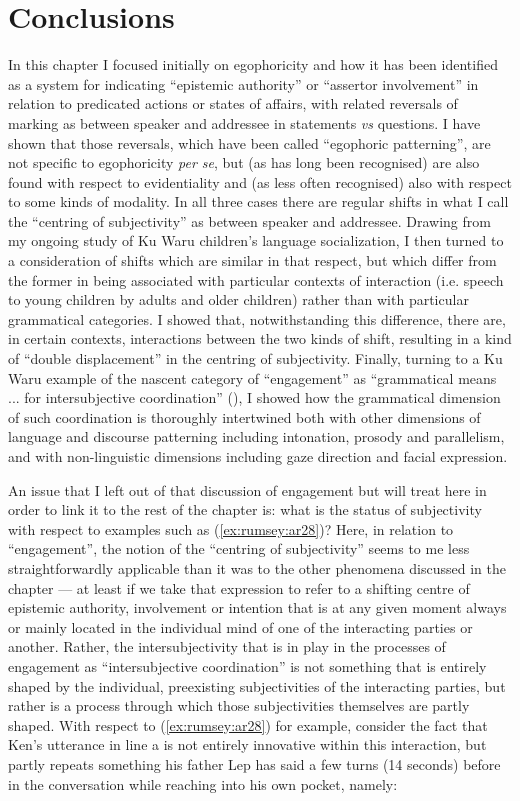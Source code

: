 \documentclass[output=paper]{langsci/langscibook}
\begin{document}
\section{Conclusions}\label{s:ar8}

In this chapter I focused initially on egophoricity and how it has been identified as a system for indicating “epistemic authority” or “assertor involvement” in relation to predicated actions or states of affairs, with related reversals of marking as between speaker and addressee in statements \textit{vs} questions. I have shown that those reversals, which have been called “egophoric patterning”, are not specific to egophoricity \textit{per se}, but (as has long been recognised) are also found with respect to evidentiality and (as less often recognised) also with respect to some kinds of modality. In all three cases there are regular shifts in what I call the “centring of subjectivity” as between speaker and addressee. Drawing from my ongoing study of Ku Waru children’s language socialization, I then turned to a consideration of shifts which are similar in that respect, but which differ from the former in being associated with particular contexts of interaction (i.e. speech to young children by adults and older children) rather than with particular grammatical categories. I showed that, notwithstanding this difference, there are, in certain contexts, interactions between the two kinds of shift, resulting in a kind of “double displacement” in the centring of subjectivity.  Finally, turning to a Ku Waru example of the nascent category of “engagement” as “grammatical means ... for intersubjective coordination” (\citealt[112]{Evansetal2018a}), I showed how the grammatical dimension of such coordination is thoroughly intertwined both with other dimensions of language and discourse patterning including intonation, prosody and parallelism, and with non-linguistic dimensions including gaze direction and facial expression.

An issue that I left out of that discussion of engagement but will treat here in order to link it to the rest of the chapter is: what is the status of subjectivity with respect to examples such as (\ref{ex:rumsey:ar28})? Here, in relation to “engagement”, the notion of the “centring of subjectivity” seems to me less straightforwardly applicable than it was to the other phenomena discussed in the chapter — at least if we take that expression to refer to a shifting centre of epistemic authority, involvement or intention that is at any given moment always or mainly located in the individual mind of one of the interacting parties or another. Rather, the intersubjectivity that is in play in the processes of engagement as “intersubjective coordination” is not something that is entirely shaped by the individual, preexisting subjectivities of the interacting parties, but rather is a process through which those subjectivities themselves are partly shaped. With respect to (\ref{ex:rumsey:ar28}) for example, consider the fact that Ken’s utterance in line a is not entirely innovative within this interaction, but partly repeats something his father Lep has said a few turns (14 seconds) before in the conversation while reaching into his own pocket, namely:
\end{document}
